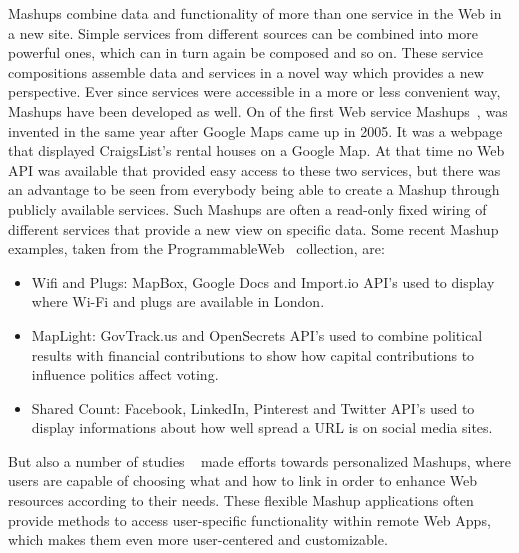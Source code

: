 \textrm{Mashups} combine data and functionality of more than one service in the Web in a new site.
Simple services from different sources can be combined into more powerful ones, which can in turn again be composed and so on.
These service compositions assemble data and services in a novel way which provides a new perspective.
Ever since services were accessible in a more or less convenient way, \textrm{Mashups} have been developed as well.
On of the first Web service \textrm{Mashups}~\cite{wwwHosuingMaps}, was invented in the same year after Google Maps came up in 2005.
It was a webpage that displayed CraigsList's rental houses on a Google Map.
At that time no \textrm{Web API} was available that provided easy access to these two services, but there was an advantage to be seen from everybody being able to create a \textrm{Mashup} through publicly available services.
Such \textrm{Mashups} are often a read-only fixed wiring of different services that provide a new view on specific data.
Some recent \textrm{Mashup} examples, taken from the \textrm{ProgrammableWeb}~\cite{wwwProgrammableWeb} collection, are:

\begin{itemize}
  \item \textrm{Wifi and Plugs}: MapBox, Google Docs and Import.io API's used to display where Wi-Fi and plugs are available in London.
  \item \textrm{MapLight}: GovTrack.us and OpenSecrets API's used to combine political results with financial contributions to show how capital contributions to influence politics affect voting.
  \item \textrm{Shared Count}: Facebook, LinkedIn, Pinterest and Twitter API's used to display informations about how well spread a URL is on social media sites.
\end{itemize}

But also a number of studies ~\cite{10.1007/978-3-642-22233-7_11}\cite{4278815}\cite{Rizzotti:2010:UST:1772690.1772861}\cite{Stolee20131289} made efforts towards personalized \textrm{Mashups}, where users are capable of choosing what and how to link in order to enhance Web resources according to their needs.
These flexible \textrm{Mashup} applications often provide methods to access user-specific functionality within remote \textrm{Web Apps}, which makes them even more user-centered and customizable.


